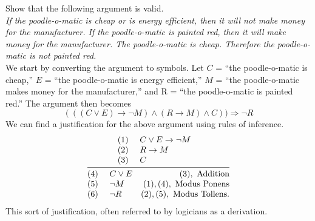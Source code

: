 \documentclass[a4paper,english,12pt]{article}
\begin{document}
\begin{exmp} Show that the following argument is valid.\\
\emph{If the poodle-o-matic is cheap or is energy efficient, then it will not make money for the manufacturer. If the poodle-o-matic is painted red, then it will make money for the manufacturer. The poodle-o-matic is cheap. Therefore the poodle-o-matic is not painted red.}\\
We start by converting the argument to symbols. Let $C$ = ``the poodle-o-matic is cheap,'' $E$ = ``the poodle-o-matic is energy efficient,'' $M$ = ``the poodle-o-matic makes money for the manufacturer,'' and R = ``the poodle-o-matic is painted red.'' The argument then becomes
\begin{equation}
		 (((C \vee E) \rightarrow \neg M) \wedge (R \rightarrow M) \wedge C)) \Rightarrow \neg R
\end{equation}
We can find a justification for the above argument using rules of inference.
\begin{equation}
\infer{\begin{array}{@{}llr@{}llr@{}llr@{}}(4)~&C \vee E& (3), \text{ Addition}\\(5)~ &\neg M&(1),(4), \text{ Modus Ponens}\\(6)~&\neg R&(2),(5), \text{ Modus Tollens}.\end{array}}{\begin{array}{@{}llr@{}llr@{}llr@{}} (1)~&C \vee E \rightarrow \neg M&\\(2)~&R \rightarrow M&\\(3)~&C&\end{array}}
\end{equation}
This sort of justification, often referred to by logicians as a derivation.
	\end{exmp}
\end{document}
